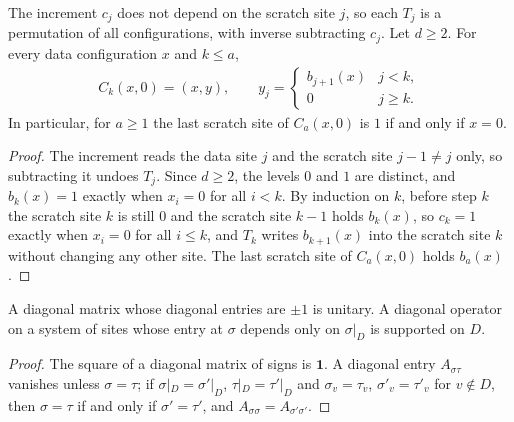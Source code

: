 \begin{lemma}
    \label{lem:zero_register_conjunction}
    \leanok
    The increment $c_j$ does not depend on the scratch site $j$, so each $T_j$ is a
    permutation of all configurations, with inverse subtracting $c_j$. Let $d\geq2$. For every
    data configuration $x$ and $k\leq a$,
    \begin{align}
        C_k(x,0)=(x,y),\qquad y_j=
        \begin{cases}
            b_{j+1}(x) & j<k,     \\
            0          & j\geq k.
        \end{cases}
    \end{align}
    In particular, for $a\geq1$ the last scratch site of $C_a(x,0)$ is $1$ if and only if
    $x=0$.
\end{lemma}
\begin{proof}\leanok
    The increment reads the data site $j$ and the scratch site $j-1\neq j$ only, so subtracting
    it undoes $T_j$. Since $d\geq2$, the levels $0$ and $1$ are distinct, and $b_k(x)=1$
    exactly when $x_i=0$ for all $i<k$. By induction on $k$, before step $k$ the scratch
    site $k$ is still $0$ and the scratch site $k-1$ holds $b_k(x)$, so $c_k=1$ exactly when
    $x_i=0$ for all $i\leq k$, and $T_k$ writes $b_{k+1}(x)$ into the scratch site $k$ without
    changing any other site. The last scratch site of $C_a(x,0)$ holds $b_a(x)$.
\end{proof}

\begin{lemma}
    \label{lem:zero_register_diagonal}
    \leanok
    A diagonal matrix whose diagonal entries are $\pm1$ is unitary. A diagonal operator on a
    system of sites whose entry at $\sigma$ depends only on $\sigma|_D$ is supported on $D$.
\end{lemma}
\begin{proof}\leanok
    The square of a diagonal matrix of signs is $\mathbf 1$. A diagonal entry
    $A_{\sigma\tau}$ vanishes unless $\sigma=\tau$; if $\sigma|_D=\sigma'|_D$,
    $\tau|_D=\tau'|_D$ and $\sigma_v=\tau_v$, $\sigma'_v=\tau'_v$ for $v\notin D$, then
    $\sigma=\tau$ if and only if $\sigma'=\tau'$, and $A_{\sigma\sigma}=A_{\sigma'\sigma'}$.
\end{proof}

